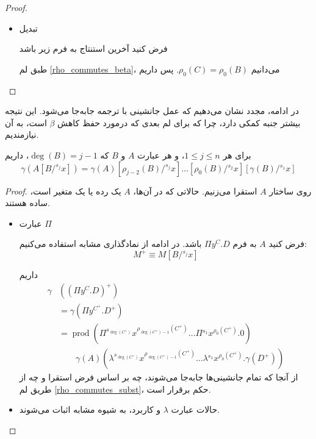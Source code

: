 \begin{proof}
\begin{itemize}
\item تبدیل

فرض کنید آخرین استنتاج به فرم زیر باشد
\begin{prooftree}
\end{prooftree}
طبق لم
\ref{rho_commutes_beta}،
می‌دانیم
$\rho_0(C) = \rho_0(B)$.
پس داریم
\begin{prooftree}
\end{prooftree}
\end{itemize}
\end{proof}

در ادامه، مجدد نشان می‌دهیم که عمل جانشینی با ترجمه جابه‌جا می‌شود.
این نتیجه بیشتر جنبه کمکی دارد، چرا که برای لم بعدی که درمورد حفظ کاهش
$\beta$
است، به آن نیازمندیم.

\begin{lmm}
برای هر
$1 \le j \le n$،
و هر عبارت
$A$ و $B$ که $\operatorname{deg}(B) = j-1$، داریم
\begin{equation*}
\gamma(A[B/{}^{s_{j}}x]) = \gamma(A) [\rho_{j-2}(B)/{}^{s_{j}}x] \dots [\rho_{0}(B)/{}^{s_{2}}x] [\gamma(B)/{}^{s_{1}}x]
\end{equation*}
\end{lmm}

\begin{proof}
روی ساختار
$A$
استقرا می‌زنیم.
حالاتی که در آن‌ها،
$A$
یک رده یا یک متغیر است، ساده هستند.

\begin{itemize}
\item عبارت $\Pi$

فرض کنید
$A$
به فرم
$\Pi y^C.D$
باشد. در ادامه از نمادگذاری مشابه
\cite{barendregt}
استفاده می‌کنیم:
\begin{equation*}
M^+ \equiv M[B/{}^{s_j}x]
\end{equation*}

داریم
\begin{align*}
\gamma&((\Pi y^C.D)^+) \\
&= \gamma(\Pi y^{C^+}.D^+) \\
&= \operatorname{prod}
(\Pi {}^{s_{\operatorname{deg}(C^+)}}x^{\rho_{\operatorname{deg}(C^+)-1}(C^+)} \dots \Pi {}^{s_{1}}x^{\rho_{0}(C^+)}.0) \\
&\qquad \gamma(A)
(\lambda {}^{s_{\operatorname{deg}(C^+)}}x^{\rho_{\operatorname{deg}(C^+)-1}(C^+)} \dots \lambda {}^{s_{1}}x^{\rho_{0}(C^+)}.\gamma(D^+))
\end{align*}
از آنجا که تمام جانشینی‌ها جابه‌جا می‌شوند، چه بر اساس فرض استقرا و چه از طریق لم
\ref{rho_commutes_subst}،
حکم برقرار است.

\item حالات عبارت $\lambda$ و کاربرد، به شیوه مشابه اثبات می‌شوند.
\end{itemize}
\end{proof}

